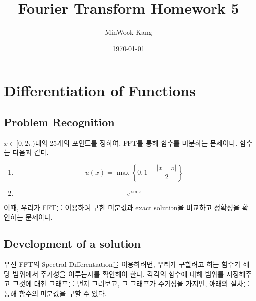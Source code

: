 \documentclass[11pt]{article}
\title{Fourier Transform Homework 5}
\author{MinWook Kang}
\date{\today}
\begin{document}
\maketitle
\pagebreak






\section{Differentiation of Functions} 
\subsection{Problem Recognition} 
$x \in [0, 2\pi)$내의 25개의 포인트를 정하여, FFT를 통해 함수를 미분하는 문제이다. 함수는 다음과 같다.

\begin{enumerate}
    \item \begin{equation} u(x) = \max\left\{0, 1 - \frac{|x - \pi|}{2}\right\}
\end{equation}

       \item  \begin{equation}
e^{\sin x}
\end{equation}
\end{enumerate}


이때, 우리가 FFT를 이용하여 구한 미분값과 exact solution을 비교하고 정확성을 확인하는 문제이다. 
\subsection{Development of a solution} 
우선 FFT의 Spectral Differentiation을 이용하려면, 우리가 구할려고 하는 함수가 해당 범위에서 주기성을 이루는지를 확인해야 한다. 각각의 함수에 대해 범위를 지정해주고 그것에 대한 그래프를 먼저 그려보고, 그 그래프가 주기성을 가지면, 아래의 절차를 통해 함수의 미분값을 구할 수 있다.
\end{document}
